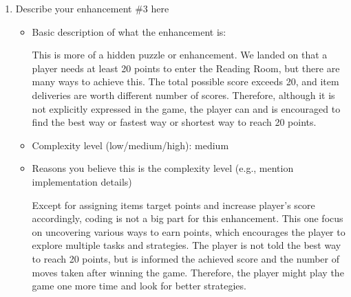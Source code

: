 \documentclass[11pt]{article}
\begin{document}
\begin{enumerate}
\begin{itemize}
       \item Complexity level (low/medium/high): medium
       \item Reasons you believe this is the complexity level (e.g., mention implementation details)

        We had the update\_score method to handle point increases for items or actions, and we had to upgrade it to the \_check\_item\_delivery method to make sure the scores are added accordingly since each item has different target points. We also implemented a score threshold for accessing the Reading Room. This part is fairly straight forward,
        but we had more thoughts on selecting the minimum score to access, which will be discussed more in the next section.
    \end{itemize}

     \item Describe your enhancement \#3 here
    \begin{itemize}
       \item Basic description of what the enhancement is:

        This is more of a hidden puzzle or enhancement. We landed on that a player needs at least 20 points to enter the Reading Room, but there are many ways to achieve this. The total possible score exceeds 20, and item deliveries are worth different number of scores. Therefore, although it is not explicitly expressed in the game, the player can and is encouraged to find the best way or fastest way or shortest way to reach 20 points.

       \item Complexity level (low/medium/high): medium
       \item Reasons you believe this is the complexity level (e.g., mention implementation details)

        Except for assigning items target points and increase player's score accordingly, coding is not a big part for this enhancement. This one focus on uncovering various ways to earn points, which encourages the player to explore multiple tasks and strategies. The player is not told the best way to reach 20 points, but is informed the achieved score and the number of moves taken after winning the game. Therefore, the player might play the game one more time and look for better strategies.

    \end{itemize}
\end{enumerate}
\end{document}
